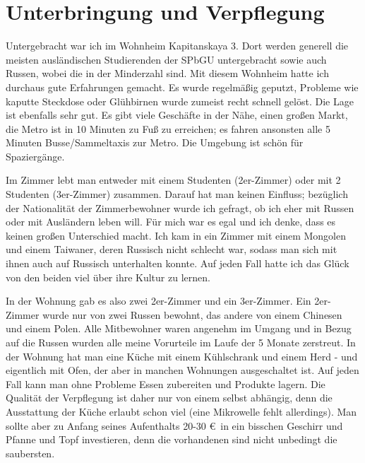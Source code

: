 \documentclass[a4paper]{scrartcl}
\begin{document}
\section*{Unterbringung und Verpflegung}
Untergebracht war ich im Wohnheim Kapitanskaya 3. Dort werden generell die meisten ausländischen Studierenden der SPbGU untergebracht sowie auch Russen, wobei die in der Minderzahl sind. Mit diesem Wohnheim hatte ich durchaus gute Erfahrungen gemacht. Es wurde regelmäßig geputzt, Probleme wie kaputte Steckdose oder Glühbirnen wurde zumeist recht schnell gelöst. Die Lage ist ebenfalls sehr gut. Es gibt viele Geschäfte in der Nähe, einen großen Markt, die Metro ist in 10 Minuten zu Fuß zu erreichen; es fahren ansonsten alle 5 Minuten Busse/Sammeltaxis zur Metro. Die Umgebung ist schön für Spaziergänge.

Im Zimmer lebt man entweder mit einem Studenten (2er-Zimmer) oder mit 2 Studenten (3er-Zimmer) zusammen. Darauf hat man keinen Einfluss; bezüglich der Nationalität der Zimmerbewohner wurde ich gefragt, ob ich eher mit Russen oder mit Ausländern leben will. Für mich war es egal und ich denke, dass es keinen großen Unterschied macht. Ich kam in ein Zimmer mit einem Mongolen und einem Taiwaner, deren Russisch nicht schlecht war, sodass man sich mit ihnen auch auf Russisch unterhalten konnte. Auf jeden Fall hatte ich das Glück von den beiden viel über ihre Kultur zu lernen.

In der Wohnung gab es also zwei 2er-Zimmer und ein 3er-Zimmer. Ein 2er-Zimmer wurde nur von zwei Russen bewohnt, das andere von einem Chinesen und einem Polen. Alle Mitbewohner waren angenehm im Umgang und in Bezug auf die Russen wurden alle meine Vorurteile im Laufe der 5 Monate zerstreut.
In der Wohnung hat man eine Küche mit einem Kühlschrank und einem Herd -  und eigentlich mit Ofen, der aber in manchen Wohnungen ausgeschaltet ist. Auf jeden Fall kann man ohne Probleme Essen zubereiten und Produkte lagern.
Die Qualität der Verpflegung ist daher nur von einem selbst abhängig, denn die Ausstattung der Küche erlaubt schon viel (eine Mikrowelle fehlt allerdings). Man sollte aber zu Anfang seines Aufenthalts 20-30 \euro\ in ein bisschen Geschirr und Pfanne und Topf investieren, denn die vorhandenen sind  nicht unbedingt die saubersten.
\end{document}
